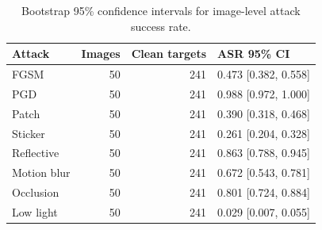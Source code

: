 \begin{table}[ht]
\caption{Bootstrap 95\% confidence intervals for image-level attack success rate.}
\label{tab:attack_ci_auto}
\small
\setlength{\tabcolsep}{4pt}
\begin{tabular}{lrrl}
\toprule
Attack & Images & Clean targets & ASR 95\% CI \\
\midrule
FGSM & 50 & 241 & 0.473 [0.382, 0.558] \\
PGD & 50 & 241 & 0.988 [0.972, 1.000] \\
Patch & 50 & 241 & 0.390 [0.318, 0.468] \\
Sticker & 50 & 241 & 0.261 [0.204, 0.328] \\
Reflective & 50 & 241 & 0.863 [0.788, 0.945] \\
Motion blur & 50 & 241 & 0.672 [0.543, 0.781] \\
Occlusion & 50 & 241 & 0.801 [0.724, 0.884] \\
Low light & 50 & 241 & 0.029 [0.007, 0.055] \\
\bottomrule
\end{tabular}
\end{table}

